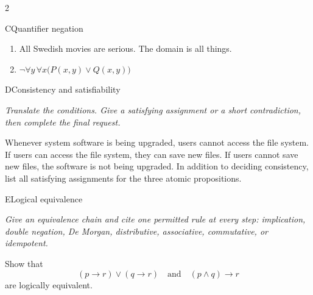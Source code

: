 \documentclass[9pt]{extarticle}
\begin{document}
\begin{multicols}{2}
\begin{CoreProblem}{C}{Quantifier negation}
\begin{enumerate}[label=(\alph*)]
  \item All Swedish movies are serious. The domain is all things.
  \item $\neg\forall y\,\forall x\bigl(P(x,y)\lor Q(x,y)\bigr)$
\end{enumerate}
\end{CoreProblem}
\columnbreak
\begin{CoreProblem}{D}{Consistency and satisfiability}
{\scriptsize\textit{Translate the conditions. Give a satisfying assignment or a short contradiction, then complete the final request.}\par}
Whenever system software is being upgraded, users cannot access the file
system. If users can access the file system, they can save new files. If users
cannot save new files, the software is not being upgraded. In addition to
deciding consistency, list all satisfying assignments for the three atomic
propositions.
\end{CoreProblem}
\begin{CoreProblem}{E}{Logical equivalence}
{\scriptsize\textit{Give an equivalence chain and cite one permitted rule at every step: implication, double negation, De Morgan, distributive, associative, commutative, or idempotent.}\par}
Show that
\[
  (p\to r)\lor(q\to r)
  \quad\text{and}\quad
  (p\land q)\to r
\]
are logically equivalent.
\end{CoreProblem}
\end{multicols}
\CoreWorkArea
\FormBreak
{}
\end{document}
